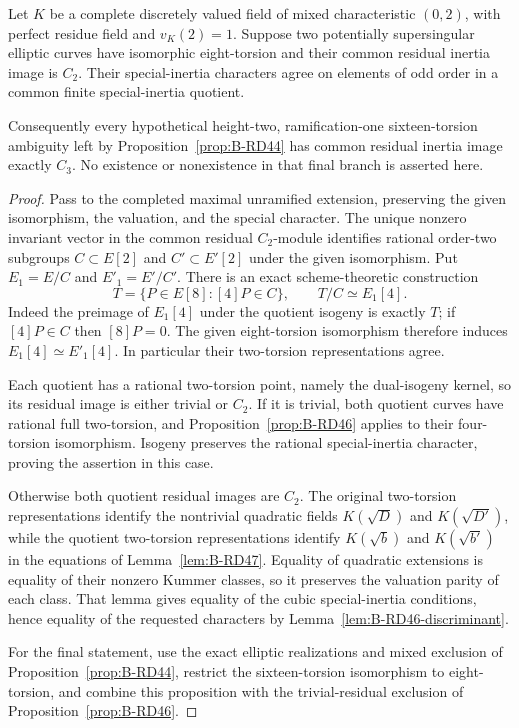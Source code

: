 \begin{proposition}
\label{prop:B-RD47}
Let $K$ be a complete discretely valued field of mixed characteristic
$(0,2)$, with perfect residue field and $v_K(2)=1$. Suppose two
potentially supersingular elliptic curves have isomorphic
eight-torsion and their common residual inertia image is $C_2$.
Their special-inertia characters agree on elements of odd
order in a common finite special-inertia quotient.

Consequently every hypothetical height-two, ramification-one
sixteen-torsion ambiguity left by
Proposition~\ref{prop:B-RD44} has common residual inertia image
exactly $C_3$. No existence or nonexistence in that final branch
is asserted here.
\end{proposition}
\begin{proof}
Pass to the completed maximal unramified extension, preserving
the given isomorphism, the valuation, and the special character.
The unique nonzero invariant vector in the common residual
$C_2$-module identifies rational order-two subgroups
$C\subset E[2]$ and $C'\subset E'[2]$ under the given
isomorphism. Put $E_1=E/C$ and $E'_1=E'/C'$.
There is an exact scheme-theoretic construction
\[
 T=\{P\in E[8]:[4]P\in C\},\qquad
                         T/C\simeq E_1[4].             \tag{B-RD47.5}
\]
Indeed the preimage of $E_1[4]$ under the quotient isogeny is
exactly $T$; if $[4]P\in C$ then $[8]P=0$.
The given eight-torsion isomorphism therefore induces
$E_1[4]\simeq E'_1[4]$. In particular their two-torsion
representations agree.

Each quotient has a rational two-torsion point, namely the
dual-isogeny kernel, so its residual image is either trivial
or $C_2$. If it is trivial, both quotient curves have rational
full two-torsion, and Proposition~\ref{prop:B-RD46} applies to
their four-torsion isomorphism. Isogeny preserves the rational
special-inertia character, proving the assertion in this case.

Otherwise both quotient residual images are $C_2$. The
original two-torsion representations identify the nontrivial
quadratic fields $K(\sqrt D)$ and $K(\sqrt {D'})$, while the
quotient two-torsion representations identify
$K(\sqrt b)$ and $K(\sqrt {b'})$ in the equations of
Lemma~\ref{lem:B-RD47}. Equality of quadratic extensions
is equality of their nonzero Kummer classes, so it preserves
the valuation parity of each class. That lemma gives equality
of the cubic special-inertia conditions, hence equality of the
requested characters by Lemma~\ref{lem:B-RD46-discriminant}.

For the final statement, use the exact elliptic realizations
and mixed exclusion of Proposition~\ref{prop:B-RD44}, restrict
the sixteen-torsion isomorphism to eight-torsion, and combine
this proposition with the trivial-residual exclusion of
Proposition~\ref{prop:B-RD46}.
\end{proof}

